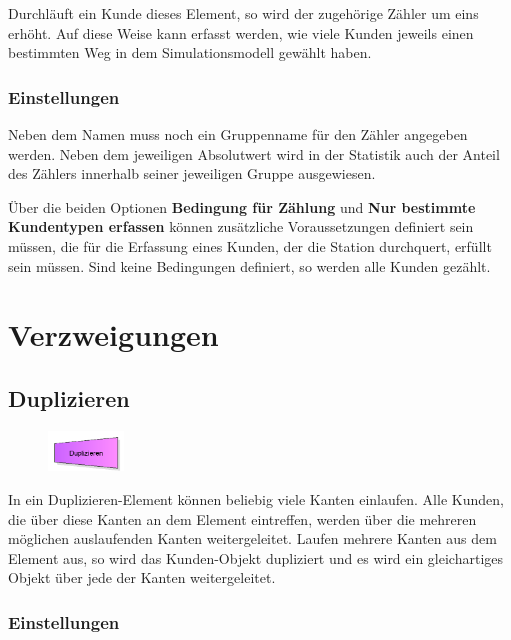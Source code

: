 Durchläuft ein Kunde dieses Element, so wird der zugehörige Zähler um eins erhöht. Auf diese Weise kann erfasst werden,
wie viele Kunden jeweils einen bestimmten Weg in dem Simulationsmodell gewählt haben.

\subsection*{Einstellungen}

Neben dem Namen muss noch ein Gruppenname für den Zähler angegeben werden. Neben dem jeweiligen
Absolutwert wird in der Statistik auch der Anteil des Zählers innerhalb seiner jeweiligen Gruppe ausgewiesen.

Über die beiden Optionen \textbf{Bedingung für Zählung} und \textbf{Nur bestimmte Kundentypen erfassen} können zusätzliche
Voraussetzungen definiert sein müssen, die für die Erfassung eines Kunden, der die Station durchquert, erfüllt sein müssen.
Sind keine Bedingungen definiert, so werden alle Kunden gezählt.





\chapter{Verzweigungen}

\section{Duplizieren}
\label{ref:ModelElementDuplicate}

\begin{figure}
\vspace{-22pt}
\includegraphics[width=2cm]{imageModelElementDuplicate.png}
\vspace{-22pt}
\end{figure}

In ein Duplizieren-Element können beliebig viele Kanten einlaufen. Alle Kunden, die über diese Kanten an dem Element eintreffen,
werden über die mehreren möglichen auslaufenden Kanten weitergeleitet. Laufen mehrere Kanten aus dem Element aus, so wird das
Kunden-Objekt dupliziert und es wird ein gleichartiges Objekt über jede der Kanten weitergeleitet.

\subsection*{Einstellungen}

